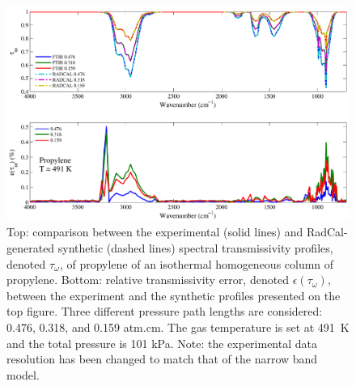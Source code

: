 \begin{figure}[p]
\includegraphics[width=\textwidth]{../Verification/Results_Test2/Propylene_491.pdf}
\caption{Top: comparison between the experimental (solid lines) and RadCal-generated synthetic (dashed lines) spectral transmissivity profiles, denoted $\tau_{\omega}$, of propylene of an isothermal homogeneous column of propylene. Bottom: relative transmissivity error, denoted $\epsilon{(\tau_{\omega})}$, between the experiment and the synthetic profiles presented on the top figure. Three different pressure path lengths are considered: 0.476, 0.318, and 0.159 atm.cm. The gas temperature is set at 491~K and the total pressure is 101 kPa. Note: the experimental data resolution has been changed to match that of the narrow band model. \label{fig:propylene_Verify_491K}}
\end{figure}
\newpage


